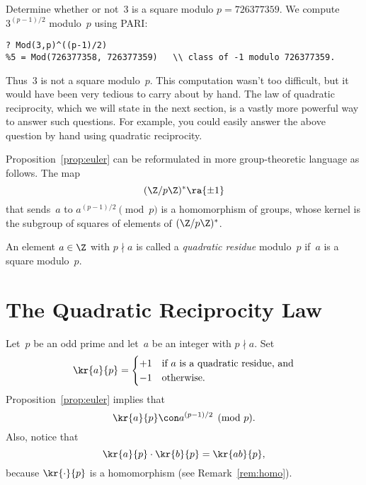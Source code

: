 \documentclass[11pt]{report}
\begin{document}
\begin{example}
  Determine whether or not~$3$ is a square
  modulo $p=726377359$.  
  We compute $3^{(p-1)/2}$ modulo~$p$
  using PARI:
  \begin{verbatim}
? Mod(3,p)^((p-1)/2)
%5 = Mod(726377358, 726377359)   \\ class of -1 modulo 726377359.
\end{verbatim}
  Thus~$3$ is not a square modulo~$p$.  This computation wasn't too
  difficult, but it would have been very tedious to carry about by hand.
  The law of quadratic reciprocity, which we will state in the next section,
  is a vastly more powerful way to answer such questions.
  For example, you could easily answer the above question
  by hand using quadratic reciprocity.
\end{example}


\begin{remark}\label{rem:homo}
  Proposition~\ref{prop:euler} can be reformulated in more group-theoretic
  language as follows.  The map
  $$
    (\Z/p\Z)^* \ra \{\pm 1\}
  $$
  that sends~$a$ to $a^{(p-1)/2}\pmod{p}$
  is a homomorphism of groups, whose kernel is
  the subgroup of squares of elements of $(\Z/p\Z)^*$.
\end{remark}


\begin{definition}
  An element $a\in\Z$ with $p\nmid a$ is called a {\em quadratic
      residue} modulo~$p$ if~$a$ is a square modulo~$p$.
\end{definition}


\section{The Quadratic Reciprocity Law}
Let~$p$ be an odd prime and let~$a$ be an integer with $p\nmid a$.
Set
$$
  \kr{a}{p} =
  \begin{cases}
    +1 & \text{if $a$ is a quadratic residue, and} \\
    -1 & \text{otherwise}.
  \end{cases}
$$
Proposition~\ref{prop:euler} implies that
$$
  \kr{a}{p} \con a^{(p-1)/2}\pmod{p}.
$$
Also, notice that
$$
  \kr{a}{p}\cdot \kr{b}{p} = \kr{ab}{p},
$$
because
$\kr{\cdot }{p}$ is a homomorphism (see Remark~\ref{rem:homo}).
\end{document}
